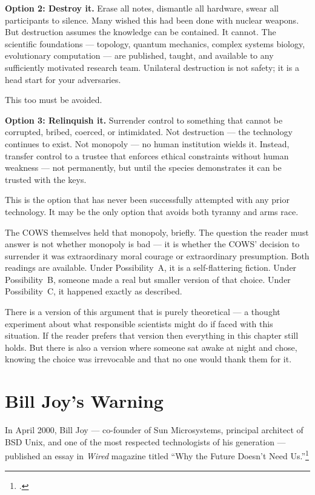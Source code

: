 \textbf{Option 2: Destroy it.} Erase all notes, dismantle all hardware, swear all participants to silence. Many wished this had been done with nuclear weapons. But destruction assumes the knowledge can be contained. It cannot. The scientific foundations --- topology, quantum mechanics, complex systems biology, evolutionary computation --- are published, taught, and available to any sufficiently motivated research team. Unilateral destruction is not safety; it is a head start for your adversaries.

This too must be avoided.

\textbf{Option 3: Relinquish it.} Surrender control to something that cannot be corrupted, bribed, coerced, or intimidated. Not destruction --- the technology continues to exist. Not monopoly --- no human institution wields it. Instead, transfer control to a trustee that enforces ethical constraints without human weakness --- not permanently, but until the species demonstrates it can be trusted with the keys.

This is the option that has never been successfully attempted with any prior technology. It may be the only option that avoids both tyranny and arms race.

The COWS themselves held that monopoly, briefly. The question the reader must answer is not whether monopoly is bad --- it is whether the COWS' decision to surrender it was extraordinary moral courage or extraordinary presumption. Both readings are available. Under Possibility~A, it is a self-flattering fiction. Under Possibility~B, someone made a real but smaller version of that choice. Under Possibility~C, it happened exactly as described.

There is a version of this argument that is purely theoretical --- a thought experiment about what responsible scientists might do if faced with this situation. If the reader prefers that version then everything in this chapter still holds. But there is also a version where someone sat awake at night and chose, knowing the choice was irrevocable and that no one would thank them for it.

\section*{Bill Joy's Warning}
\label{spine:wr-bill-joys-warning}

In April 2000, Bill Joy --- co-founder of Sun Microsystems, principal architect of BSD Unix, and one of the most respected technologists of his generation --- %
published an essay in \textit{Wired} magazine titled ``Why the Future Doesn't Need Us.''\footcite{joy2000}


